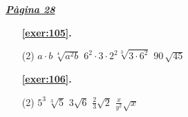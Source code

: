 
\hyperlink{page.28}{\textbf{\em Pàgina 28}}
\begin{enumerate}



 \item[\fontfamily{phv}\selectfont\color{blue}\textbf{\ref{exer:105}. }] \label{ans:105}
 \begin{tasks}[column-sep=1em, item-indent=1.3333em](2)
	 \task $a\cdot b\,\sqrt [4]{a^2 b}$
	 \task* $6^2 \cdot 3 \cdot 2^2 \sqrt [3]{3\cdot 6^2}$
	 \task $90\,\sqrt {45}$
\end{tasks}
 \end{enumerate}
\begin{enumerate}



 \item[\fontfamily{phv}\selectfont\color{blue}\textbf{\ref{exer:106}. }] \label{ans:106}
 \begin{tasks}[column-sep=1em, item-indent=1.3333em](2)
	 \task $5^3\,\sqrt [{3}]{5}$
	 \task $3\sqrt {6}$
	 \task $\frac {2}{3}\sqrt {2}$
	 \task $\frac {x}{y^2}\sqrt {x }$
\end{tasks}
 \end{enumerate}
\vspace{0.3cm}



